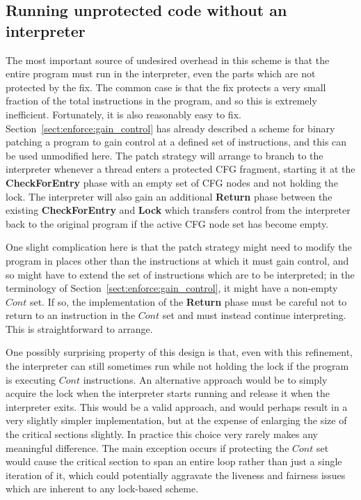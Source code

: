 \subsection{Running unprotected code without an interpreter}

The most important source of undesired overhead in this scheme is that
the entire program must run in the interpreter, even the parts which
are not protected by the fix.  The common case is that the fix
protects a very small fraction of the total instructions in the
program, and so this is extremely inefficient.  Fortunately, it is
also reasonably easy to fix.  Section~\ref{sect:enforce:gain_control}
has already described a scheme for binary patching a program to gain
control at a defined set of instructions, and this can be used
unmodified here.  The patch strategy will arrange to branch to the
interpreter whenever a thread enters a protected CFG fragment,
starting it at the \textbf{CheckForEntry} phase with an empty set of
CFG nodes and not holding the lock.  The interpreter will also gain an
additional \textbf{Return} phase between the existing
\textbf{CheckForEntry} and \textbf{Lock} which transfers control from
the interpreter back to the original program if the active CFG node
set has become empty.

One slight complication here is that the patch strategy might need to
modify the program in places other than the instructions at which it
must gain control, and so might have to extend the set of instructions
which are to be interpreted; in the terminology of
Section~\ref{sect:enforce:gain_control}, it might have a non-empty
$\mathit{Cont}$ set.  If so, the implementation of the \textbf{Return}
phase must be careful not to return to an instruction in the
$\mathit{Cont}$ set and must instead continue interpreting.  This is
straightforward to arrange.

One possibly surprising property of this design is that, even with
this refinement, the interpreter can still sometimes run while not
holding the lock if the program is executing $\mathit{Cont}$
instructions.  An alternative approach would be to simply acquire the
lock when the interpreter starts running and release it when the
interpreter exits.  This would be a valid approach, and would perhaps
result in a very slightly simpler implementation, but at the expense
of enlarging the size of the critical sections slightly.  In practice
this choice very rarely makes any meaningful difference.  The main
exception occurs if protecting the $\mathit{Cont}$ set would cause the
critical section to span an entire loop rather than just a single
iteration of it, which could potentially aggravate the liveness and
fairness issues which are inherent to any lock-based scheme.


